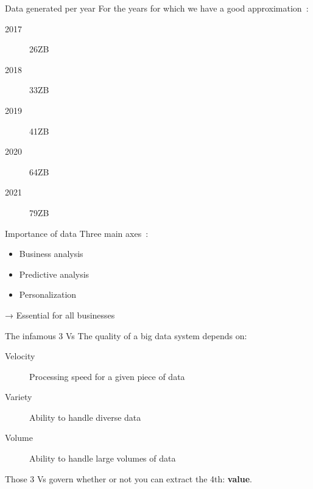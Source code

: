 \begin{frame}{Data generated per year}
  For the years for which we have a good approximation~:
  \begin{description}
    \item[2017] 26ZB
    \item[2018] 33ZB
    \item[2019] 41ZB
    \item[2020] 64ZB
    \item[2021] 79ZB
  \end{description}
\end{frame}

\begin{frame}{Importance of data}
  Three main axes~:
  \begin{itemize}
    \item Business analysis
    \item Predictive analysis
    \item Personalization
  \end{itemize}

  → Essential for all businesses
\end{frame}

\begin{frame}{The infamous 3 Vs}
  The quality of a big data system depends on:

  \begin{description}
    \item[Velocity] Processing speed for a given piece of data
    \item[Variety] Ability to handle diverse data
    \item[Volume] Ability to handle large volumes of data
  \end{description}

  Those 3 Vs govern whether or not you can extract the 4th: \textbf{value}.
\end{frame}
